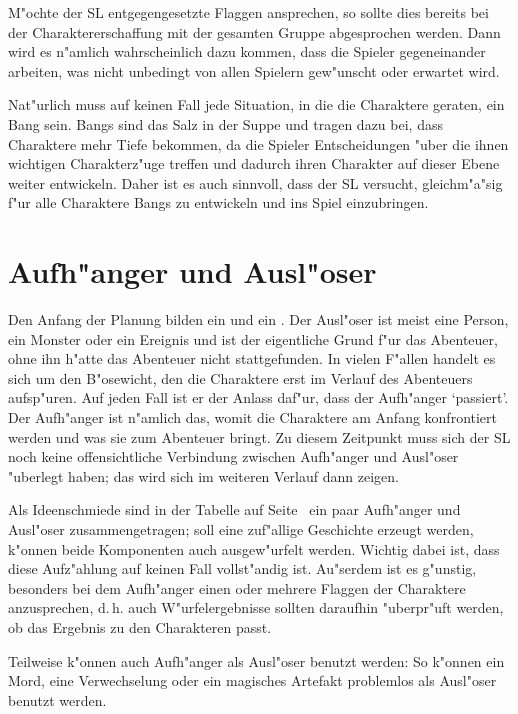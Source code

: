 M"ochte der SL entgegengesetzte Flaggen ansprechen, so sollte dies bereits bei der Charaktererschaffung mit der gesamten Gruppe abgesprochen werden. Dann wird es n"amlich wahrscheinlich dazu kommen, dass die Spieler gegeneinander arbeiten, was nicht unbedingt von allen Spielern gew"unscht oder erwartet wird.

Nat"urlich muss auf keinen Fall jede Situation, in die die Charaktere geraten, ein Bang sein. Bangs sind das Salz in der Suppe und tragen dazu bei, dass Charaktere mehr Tiefe bekommen, da die Spieler Entscheidungen "uber die ihnen wichtigen Charakterz"uge treffen und dadurch ihren Charakter auf dieser Ebene weiter entwickeln. Daher ist es auch sinnvoll, dass der SL versucht, gleichm"a"sig f"ur alle Charaktere Bangs zu entwickeln und ins Spiel einzubringen.




\section{Aufh"anger und Ausl"oser}
Den Anfang der Planung bilden ein  und ein . Der Ausl"oser ist meist eine Person, ein Monster oder ein Ereignis und ist der eigentliche Grund f"ur das Abenteuer, ohne ihn h"atte das Abenteuer nicht stattgefunden. In vielen F"allen handelt es sich um den B"osewicht, den die Charaktere erst im Verlauf des Abenteuers aufsp"uren. Auf jeden Fall ist er der Anlass daf"ur, dass der Aufh"anger `passiert'. Der Aufh"anger ist n"amlich das, womit die Charaktere am Anfang konfrontiert werden und was sie zum Abenteuer bringt. Zu diesem Zeitpunkt muss sich der SL noch keine offensichtliche Verbindung zwischen Aufh"anger und Ausl"oser "uberlegt haben; das wird sich im weiteren Verlauf dann zeigen.

Als Ideenschmiede sind in der Tabelle auf Seite~\pageref{AufhaengerUndAusloeser} ein paar Aufh"anger und Ausl"oser zusammengetragen; soll eine zuf"allige Geschichte erzeugt werden, k"onnen beide Komponenten auch ausgew"urfelt werden. Wichtig dabei ist, dass diese Aufz"ahlung auf keinen Fall vollst"andig ist. Au"serdem ist es g"unstig, besonders bei dem Aufh"anger einen oder mehrere Flaggen der Charaktere anzusprechen, d.\,h. auch W"urfelergebnisse sollten daraufhin "uberpr"uft werden, ob das Ergebnis zu den Charakteren passt.

Teilweise k"onnen auch Aufh"anger als Ausl"oser benutzt werden: So k"onnen ein Mord, eine Verwechselung oder ein magisches Artefakt problemlos als Ausl"oser benutzt werden. 

